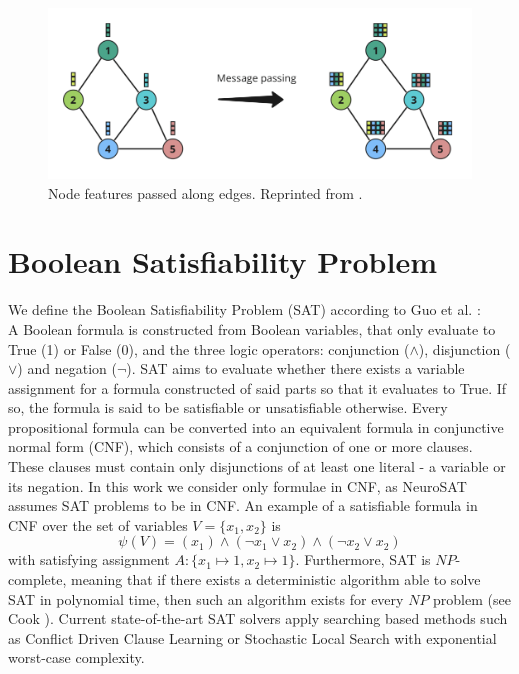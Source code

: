 \begin{figure}
    \includegraphics[width=\textwidth]{img/message_passing.png}
    \caption[Message passing]{Node features passed along edges. Reprinted from \cite{ali2023gnns}.}
\end{figure}


\section{Boolean Satisfiability Problem}
\label{sec:SAT}
We define the Boolean Satisfiability Problem (SAT) according to Guo et al. \cite{guo2023machine}: \\
A Boolean formula is constructed from Boolean variables, that only evaluate to True (1) or False (0), and the three logic operators: conjunction ($\wedge$), disjunction ($\vee$) and negation ($\neg$). SAT aims to evaluate whether there exists a variable assignment for a formula constructed of said parts so that it evaluates to True. If so, the formula is said to be satisfiable or unsatisfiable otherwise. Every propositional formula can be converted into an equivalent formula in conjunctive normal form (CNF), which consists of a conjunction of one or more clauses. These clauses must contain only disjunctions of at least one literal - a variable or its negation. In this work we consider only formulae in CNF, as NeuroSAT \cite{selsam2018learning} assumes SAT problems to be in CNF. An example of a satisfiable formula in CNF over the set of variables $V=\{x_1,x_2\}$ is 
$$\psi(V) = (x_1) \land (\neg x_1 \lor x_2) \land (\neg x_2 \lor x_2)$$
with satisfying assignment $A:\{x_1 \mapsto 1, x_2 \mapsto 1\}$. Furthermore, SAT is $NP$-complete, meaning that if there exists a deterministic algorithm able to solve SAT in polynomial time, then such an algorithm exists for every $NP$ problem (see Cook \cite{cook2023complexity}). Current state-of-the-art SAT solvers apply searching based methods such as Conflict Driven Clause Learning \cite{marques1999grasp} or Stochastic Local Search \cite{selman1993local} with exponential worst-case complexity.

